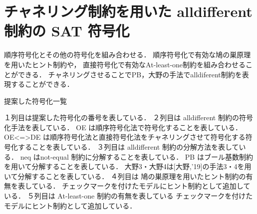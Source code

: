 \section{チャネリング制約を用いた alldifferent 制約の SAT 符号化}

順序符号化とその他の符号化を組み合わせる．
順序符号化で有効な鳩の巣原理を用いたヒント制約や，
直接符号化で有効なAt-least-one制約を組み合わせることができる．
チャネリングさせることでPB，大野の手法でalldiferent制約を表現することができる．


\begin{table}[h]
    \caption{提案した符号化一覧}
    \label{table:model}
    {\scriptsize }
\end{table}
１列目は提案した符号化の番号を表している．
２列目は alldifferent 制約の符号化手法を表している．
OE は順序符号化法で符号化することを表している．
OE\textless=\textgreater DE は順序符号化法と直接符号化法をチャネリングさせて符号化する符号化することを表している．
３列目は alldifferent 制約の分解方法を表している．
neq はnot-equal 制約に分解することを表している．
PB はブール基数制約を用いて分解することを表している．
大野3・大野4は[大野,'19]の手法3・4を用いて分解することを表している．
４列目は 鳩の巣原理を用いたヒント制約の有無を表している．
チェックマークを付けたモデルにヒント制約として追加している．
５列目は At-least-one 制約の有無を表している
チェックマークを付けたモデルにヒント制約として追加している．




